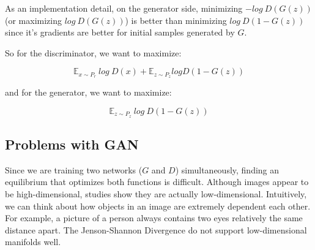 As an implementation detail, on the generator side, minimizing $-log~D(G(z))$ (or maximizing $log~D(G(z))$) is better than minimizing $log~D(1-G(z))$ since it's gradients are better for initial samples generated by $G$.

So for the discriminator, we want to maximize:

\begin{equation}
	\label{eq:maxD}
	\mathbb{E}_{x \sim P_r}~log~D(x) + \mathbb{E}_{z \sim P_z} log D(1-G(z))
\end{equation}

and for the generator, we want to maximize:

\begin{equation}
	\label{eq:maxG}
	\mathbb{E}_{z \sim P_z}~log~D(1-G(z))
\end{equation}

\subsection{Problems with GAN}
Since we are training two networks ($G$ and $D$) simultaneously, finding an equilibrium that optimizes both functions is difficult. Although images appear to be high-dimensional, studies show they are actually low-dimensional. Intuitively, we can think about how objects in an image are extremely dependent each other. For example, a picture of a person always contains two eyes relatively the same distance apart. The Jenson-Shannon Divergence do not support low-dimensional manifolds well. 
